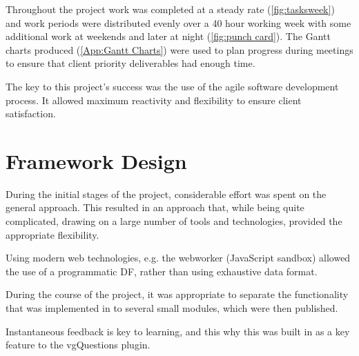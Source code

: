 Throughout the project work was completed at a steady rate (\autoref{fig:tasksweek}) and work periods were distributed evenly over a 40 hour working week with some additional work at weekends and later at night (\autoref{fig:punch card}). The Gantt charts produced (\cref{App:Gantt Charts}) were used to plan progress during meetings to ensure that client priority deliverables had enough time.

The key to this project's success was the use of the agile software development process. It allowed maximum reactivity and flexibility to ensure client satisfaction.









\section{Framework Design}


During the initial stages of the project, considerable effort was spent on the general approach. This resulted in an approach that, while being quite complicated, drawing on a large number of tools and technologies, provided the appropriate flexibility.

Using modern web technologies, e.g. the \gls{webworker} (JavaScript sandbox) allowed the use of a programmatic \gls{DF}, rather than using exhaustive data format.

During the course of the project, it was appropriate to separate the functionality that was implemented in to several small modules, which were then published.

Instantaneous feedback is key to learning, and this why this was built in as a key feature to the \gls{vgQuestions} plugin.

